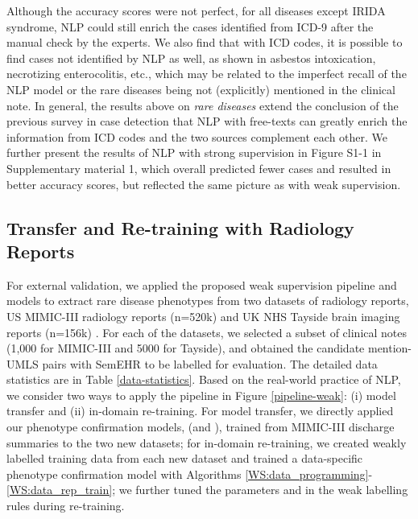 \documentclass[twocolumn]{bmcart}
\begin{document}
Although the accuracy scores were not perfect, for all diseases except IRIDA syndrome, NLP could still enrich the cases identified from ICD-9 after the manual check by the experts. We also find that with ICD codes, it is possible to find cases not identified by NLP as well, as shown in asbestos intoxication, necrotizing enterocolitis, etc., which may be related to the imperfect recall of the NLP model or the rare diseases being not (explicitly) mentioned in the clinical note. In general, the results above on \textit{rare diseases} extend the conclusion of the previous survey in case detection \cite{Ford2016} that NLP with free-texts can greatly enrich the information from ICD codes and the two sources complement each other. We further present the results of NLP with strong supervision in Figure S1-1 in Supplementary material 1, which overall predicted fewer cases and resulted in better accuracy scores, but reflected the same picture as with weak supervision.

\subsection*{Transfer and Re-training with Radiology Reports}
For external validation, we applied the proposed weak supervision pipeline and models to extract rare disease phenotypes from two datasets of radiology reports, US MIMIC-III radiology reports (n=520k) \cite{johnson_mimic-iii_2016} and UK NHS Tayside brain imaging reports (n=156k) \cite{gorinski_named_2019}. For each of the datasets, we selected a subset of clinical notes (1,000 for MIMIC-III and 5000 for Tayside), and obtained the candidate mention-UMLS pairs with SemEHR to be labelled for evaluation. The detailed data statistics are in Table \ref{data-statistics}. Based on the real-world practice of NLP, we consider two ways to apply the pipeline in Figure \ref{pipeline-weak}: (i) model transfer and (ii) in-domain re-training. For model transfer, we directly applied our phenotype confirmation models,  (and ), trained from MIMIC-III discharge summaries to the two new datasets; for in-domain re-training, we created weakly labelled training data from each new dataset and trained a data-specific phenotype confirmation model with Algorithms \ref{WS:data_programming}-\ref{WS:data_rep_train}; we further tuned the parameters  and  in the weak labelling rules during re-training.
\end{document}
